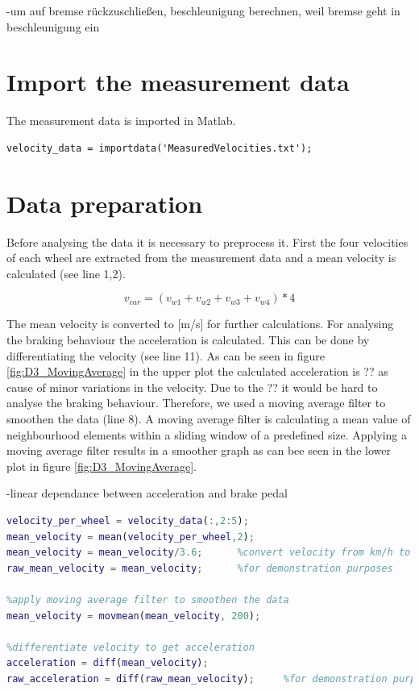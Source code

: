 -um auf bremse rückzuschließen, beschleunigung berechnen, weil bremse geht in beschleunigung ein
\section{Import the measurement data}
The measurement data is imported in Matlab.

\begin{lstlisting}[basicstyle=\scriptsize	,caption= Import measurement data in Matlab,label= lst:D3Import]
%import velocity data
velocity_data = importdata('MeasuredVelocities.txt');
\end{lstlisting}

\section{Data preparation}
Before analysing the data it is necessary to preprocess it. First the four velocities of each wheel are extracted from the measurement data and a mean velocity is calculated (see line 1,2). 

\begin{equation}
	v_{car} = (v_{w1} +v_{w2} + v_{w3} +v_{w4})*4
\end{equation}


The mean velocity is converted to [m/s] for further calculations.
For analysing the braking behaviour the acceleration is calculated.
This can be done by differentiating the velocity (see line 11).
As can be seen in figure \ref{fig:D3_MovingAverage} in the upper plot the calculated acceleration is ?? as cause of minor variations in the velocity.
Due to the ?? it would be hard to analyse the braking behaviour. Therefore, we used a moving average filter to smoothen the data (line 8).
A moving average filter is calculating a mean value of neighbourhood elements within a sliding window of a predefined size.
Applying a moving average filter results in a smoother graph as can bee seen in the lower plot in figure \ref{fig:D3_MovingAverage}.


-linear dependance between acceleration and brake pedal
\begin{lstlisting}[language=Matlab,basicstyle=\scriptsize	,caption= Preprocessing measurement data,label= lst:D3Preprocess]
%compute mean velocity of all 4 wheels
velocity_per_wheel = velocity_data(:,2:5);
mean_velocity = mean(velocity_per_wheel,2);
mean_velocity = mean_velocity/3.6;      %convert velocity from km/h to m/s
raw_mean_velocity = mean_velocity;      %for demonstration purposes

%apply moving average filter to smoothen the data
mean_velocity = movmean(mean_velocity, 200); 

%differentiate velocity to get acceleration
acceleration = diff(mean_velocity);
raw_acceleration = diff(raw_mean_velocity);     %for demonstration purposes
\end{lstlisting}

